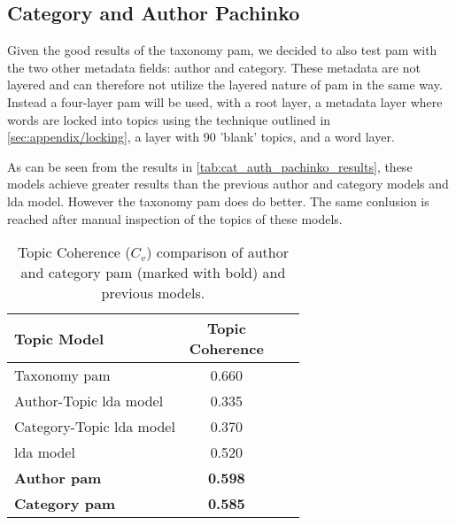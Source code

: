 \subsection{Category and Author Pachinko}\label{app:cat_auth_pachinko}
Given the good results of the taxonomy \gls{pam}, we decided to also test \gls{pam} with the two other metadata fields: author and category.
These metadata are not layered and can therefore not utilize the layered nature of \gls{pam} in the same way.
Instead a four-layer \gls{pam} will be used, with a root layer, a metadata layer where words are locked into topics using the technique outlined in \autoref{sec:appendix/locking}, a layer with 90 'blank' topics, and a word layer.

As can be seen from the results in \autoref{tab:cat_auth_pachinko_results}, these models achieve greater results than the previous author and category models and \gls{lda} model.
However the taxonomy \gls{pam} does do better.
The same conlusion is reached after manual inspection of the topics of these models.

\begin{table}[h]
	\centering
	\caption{Topic Coherence ($C_v$) comparison of author and category \gls{pam} (marked with bold) and previous models.}
	\begin{tabular}{l|c|c|c}
		Topic Model & \makecell{Topic \\ Coherence} \\
		\midrule
		Taxonomy \acrlong{pam} & 0.660 \\
		Author-Topic \acrlong{lda} model & 0.335 \\
		Category-Topic \acrlong{lda} model & 0.370 \\
		\acrfull{lda} model & 0.520 \\
		\textbf{Author \acrlong{pam}} & \textbf{0.598} \\
		\textbf{Category \acrlong{pam}} & \textbf{0.585} \\
	\end{tabular}
	\label{tab:cat_auth_pachinko_results}
\end{table}

